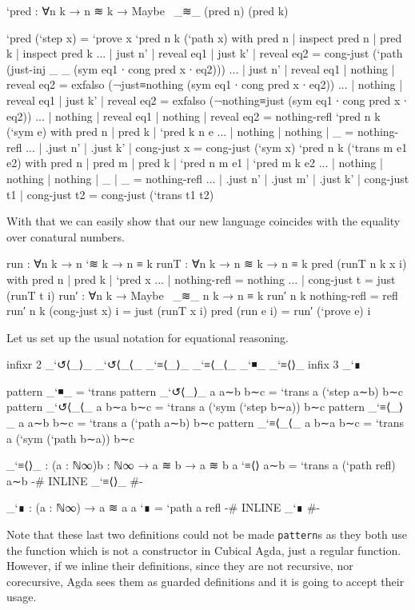 \begin{code}
`pred : ∀{n k} → n ≋ k → Maybe~ _≋_ (pred n) (pred k)
\end{code}
\begin{code}[hide]
`pred (`step x) = `prove x
`pred {n} {k} (`path x) with pred n | inspect pred n | pred k | inspect pred k
... | just n' | reveal eq1 | just k' | reveal eq2 = cong-just (`path (just-inj _ _ (sym eq1 ∙ cong pred x ∙ eq2)))
... | just n' | reveal eq1 | nothing | reveal eq2 = exfalso (¬just≡nothing (sym eq1 ∙ cong pred x ∙ eq2))
... | nothing | reveal eq1 | just k' | reveal eq2 = exfalso (¬nothing≡just (sym eq1 ∙ cong pred x ∙ eq2))
... | nothing | reveal eq1 | nothing | reveal eq2 = nothing-refl
`pred {n} {k} (`sym e) with pred n | pred k | `pred {k} {n} e
... | nothing  | nothing  | _ = nothing-refl
... | .just n' | .just k' | cong-just x = cong-just (`sym x)
`pred {n} {k} (`trans {m} e1 e2) with pred n | pred m | pred k | `pred {n} {m} e1 | `pred {m} {k} e2
... | nothing  | nothing  | nothing  | _  | _  = nothing-refl
... | .just n' | .just m' | .just k' | cong-just t1 | cong-just t2 = cong-just (`trans t1 t2)
\end{code}

With that we can easily show that our new language coincides with the equality over conatural numbers.

\begin{code}
run : ∀{n k} → n `≋ k → n ≡ k
runT : ∀{n k} → n ≋ k → n ≡ k
pred (runT {n} {k} x i) with {pred n} | {pred k} | `pred x
... | nothing-refl = nothing
... | cong-just t = just (runT t i)
run′ : ∀{n k} → Maybe~ _≋_ n k → n ≡ k
run′ {n} {k} nothing-refl = refl
run′ {n} {k} (cong-just x) i = just (runT x i)
pred (run e i) = run′ (`prove e) i
\end{code}

Let us set up the usual notation for equational reasoning.

\begin{code}[hide]
infixr 2 _`↺⟨_⟩_ _`↺⟨_⟨_ _`≡⟨_⟩_ _`≡⟨_⟨_ _`◾_ _`≡⟨⟩_
infix  3 _`∎
\end{code}
\begin{code}
pattern _`◾_ = `trans
pattern _`↺⟨_⟩_ a a∼b b∼c = `trans {a} (`step a∼b) b∼c
pattern _`↺⟨_⟨_ a b∼a b∼c = `trans {a} (`sym (`step b∼a)) b∼c
pattern _`≡⟨_⟩_ a a∼b b∼c = `trans {a} (`path a∼b) b∼c
pattern _`≡⟨_⟨_ a b∼a b∼c = `trans {a} (`sym (`path b∼a)) b∼c

_`≡⟨⟩_ : (a : ℕ∞){b : ℕ∞} → a ≋ b → a ≋ b
a `≡⟨⟩ a∼b = `trans {a} (`path refl) a∼b
{-# INLINE _`≡⟨⟩_ #-}

_`∎ : (a : ℕ∞) → a ≋ a
a `∎ = `path  {a} refl
{-# INLINE _`∎ #-}
\end{code}

Note that these last two definitions could not be made \texttt{pattern}s
as they both use the  function which is not a constructor
in Cubical Agda, just a regular function. However, if we inline their definitions,
since they are not recursive, nor corecursive, Agda sees them as guarded definitions
and it is going to accept their usage.
